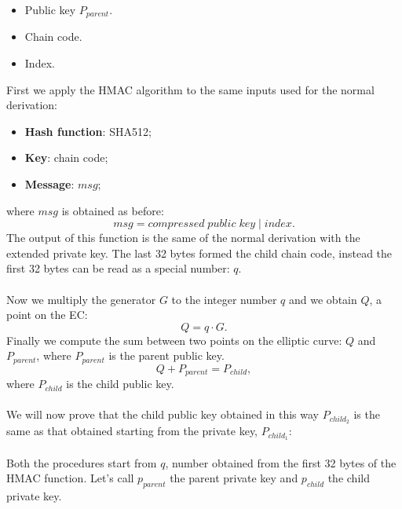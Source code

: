 \begin{itemize}
	\item Public key $P_{parent}$.
	\item Chain code.
	\item Index.
\end{itemize}
First we apply the HMAC algorithm to the same inputs used for the normal derivation:
\begin{itemize}[label=$\odot$]
	\item \textbf{Hash function}: SHA512;
	\item \textbf{Key}: chain code;
	\item \textbf{Message}: $msg$;
\end{itemize}
where $msg$ is obtained as before:
\begin{equation*}
msg = compressed \; public\;key \;|\; index.
\end{equation*}
The output of this function is the same of the normal derivation with the extended private key. The last 32 bytes formed the child chain code, instead the first 32 bytes can be read as a special number: $q$. 
\\ \\
Now we multiply the generator $G$ to the integer number $q$ and we obtain $Q$, a point on the EC:
\begin{equation*}
Q=q\cdot G.
\end{equation*}
Finally we compute the sum between two points on the elliptic curve: $Q$ and $P_{parent}$, where $P_{parent}$ is the parent public key.
\begin{equation*}
Q+P_{parent}=P_{child},
\end{equation*}
where $P_{child}$ is the child public key. 
\\ \\
We will now prove that the child public key obtained in this way $P_{child_2}$ is the same as that obtained starting from the private key, $P_{child_1}$:
\\ \\
Both the procedures start from $q$, number obtained from the first 32 bytes of the HMAC function. Let's call $p_{parent}$ the parent private key and $p_{child}$ the child private key.

